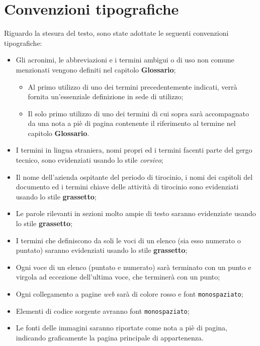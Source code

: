 \section*{Convenzioni tipografiche}

Riguardo la stesura del testo, sono state adottate le seguenti convenzioni tipografiche:
\begin{itemize}
	\item Gli acronimi, le abbreviazioni e i termini ambigui o di uso non comune menzionati vengono definiti nel capitolo \textbf{Glossario}; 
        \begin{itemize}
            \item Al primo utilizzo di uno dei termini precedentemente indicati, verrà fornita un'essenziale definizione in sede di utilizzo;
            \item Il solo primo utilizzo di uno dei termini di cui sopra sarà accompagnato da una nota a piè di pagina contenente il riferimento al termine nel capitolo \textbf{Glossario}.
        \end{itemize} 
	\item I termini in lingua straniera, nomi propri ed i termini facenti parte del gergo tecnico, sono evidenziati usando lo stile \textit{corsivo};
	\item Il nome dell'azienda ospitante del periodo di tirocinio, i nomi dei capitoli del documento ed i termini chiave delle attività di tirocinio sono evidenziati usando lo stile \textbf{grassetto};
	\item Le parole rilevanti in sezioni molto ampie di testo saranno evidenziate usando lo stile \textbf{grassetto};
	\item I termini che definiscono da soli le voci di un elenco (sia esso numerato o puntato) saranno evidenziati usando lo stile \textbf{grassetto};
	\item Ogni voce di un elenco (puntato e numerato) sarà terminato con un punto e virgola ad eccezione dell'ultima voce, che terminerà con un punto;
	\item Ogni collegamento a pagine \textit{web} sarà di colore rosso e font \texttt{monospaziato};
	\item Elementi di codice sorgente avranno font \texttt{monospaziato};
	\item Le fonti delle immagini saranno riportate come nota a piè di pagina, indicando graficamente la pagina principale di appartenenza.
\end{itemize}



\endgroup

\vfill
